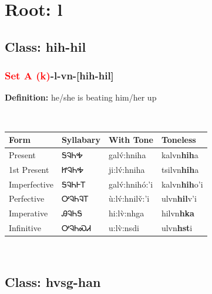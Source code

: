 \needspace{4in}
\section*{Root: l}
\nopagebreak
{}
\needspace{3in}
\subsection*{Class: hih-hil}
\nopagebreak
\needspace{2in}
\subsubsection*{\textcolor{Red}{Set A (k)}{-}\textbf{l}{-}vn{-}[hih-hil]}
\nopagebreak
\textbf{Definition: } he/she is beating him/her up
\\[0.5em]
\begin{tabularx}{\textwidth}{l X X X}%
\toprule%
\textbf{Form}&\textbf{Syllabary}&\textbf{With Tone}&\textbf{Toneless}\\%
\midrule%
Present&ᎦᎸᏂᎭ&galv́:hniha&kalvn\textbf{hih}a\\%
1st Present&ᏥᎸᏂᎭ&ji:lv́:hniha&tsilvn\textbf{hih}a\\%
Imperfective&ᎦᎸᏂᎰᎢ&galv́:hnihó:’i&kalvn\textbf{hih}o'i\\%
Perfective&ᎤᎸᏂᎸᎢ&ù:lv́:hnilv̌:’i&ulvn\textbf{hil}v'i\\%
Imperative&ᎯᎸᏂᎦ&hi:lv̀:nhga&hilvn\textbf{hka}\\%
Infinitive&ᎤᎸᏂᏍᏗ&u:lv̀:nsdi&ulvn\textbf{hst}i\\%
\bottomrule%
\end{tabularx}
\\[1em]
\needspace{3in}
\subsection*{Class: hvsg-han}
\nopagebreak
\needspace{2in}
